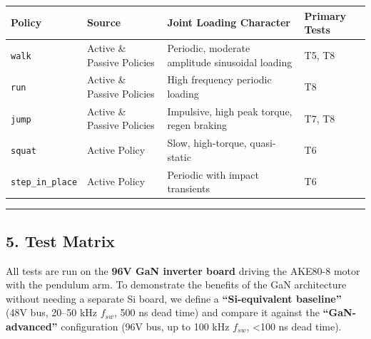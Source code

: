 \documentclass[
]{article}
\newcounter{none} %
\begin{document}
{\def\LTcaptype{none} %
\begin{longtable}[]{@{}
  >{\raggedright\arraybackslash}p{}
  >{\raggedright\arraybackslash}p{}
  >{\raggedright\arraybackslash}p{}
  >{\raggedright\arraybackslash}p{}@{}}
\toprule\noalign{}
\begin{minipage}[b]{\linewidth}\raggedright
Policy
\end{minipage} & \begin{minipage}[b]{\linewidth}\raggedright
Source
\end{minipage} & \begin{minipage}[b]{\linewidth}\raggedright
Joint Loading Character
\end{minipage} & \begin{minipage}[b]{\linewidth}\raggedright
Primary Tests
\end{minipage} \\
\midrule\noalign{}
\endhead
\bottomrule\noalign{}
\endlastfoot
\texttt{walk} & Active \& Passive Policies & Periodic, moderate
amplitude sinusoidal loading & T5, T8 \\
\texttt{run} & Active \& Passive Policies & High frequency periodic
loading & T8 \\
\texttt{jump} & Active \& Passive Policies & Impulsive, high peak
torque, regen braking & T7, T8 \\
\texttt{squat} & Active Policy & Slow, high-torque, quasi-static & T6 \\
\texttt{step\_in\_place} & Active Policy & Periodic with impact
transients & T6 \\
\end{longtable}
}

\begin{center}\rule{0.5\linewidth}{0.5pt}\end{center}

\subsection{5. Test Matrix}\label{test-matrix}

All tests are run on the \textbf{96V GaN inverter board} driving the
AKE80-8 motor with the pendulum arm. To demonstrate the benefits of the
GaN architecture without needing a separate Si board, we define a
\textbf{``Si-equivalent baseline''} (48V bus, 20--50 kHz \(f_{sw}\), 500
ns dead time) and compare it against the \textbf{``GaN-advanced''}
configuration (96V bus, up to 100 kHz \(f_{sw}\), \textless100 ns dead
time).
\end{document}
